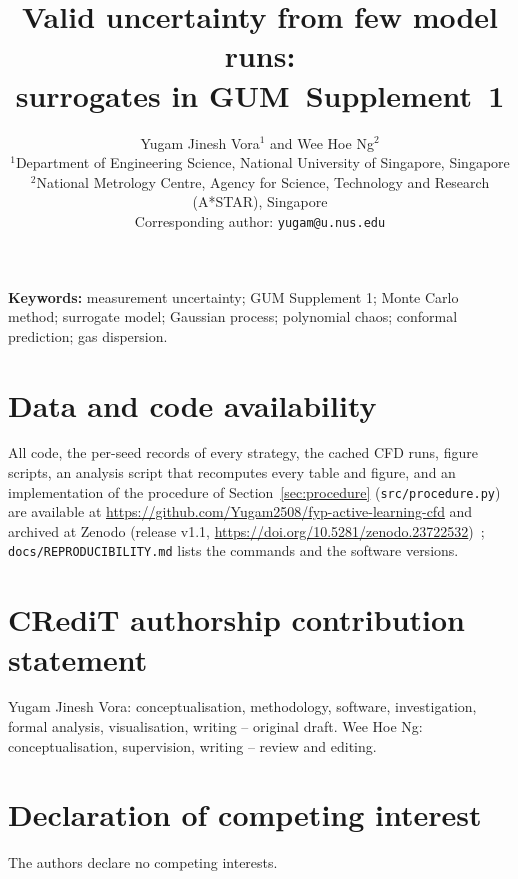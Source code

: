 \documentclass[11pt]{article}
\title{\bfseries Valid uncertainty from few model runs:\\ surrogates in GUM~Supplement~1}
\author{%
Yugam Jinesh Vora$^{1}$ and Wee Hoe Ng$^{2}$\\[4pt]
\small $^{1}$Department of Engineering Science, National University of
Singapore, Singapore\\
\small $^{2}$National Metrology Centre, Agency for Science, Technology and
Research (A*STAR), Singapore\\
\small Corresponding author: \texttt{yugam@u.nus.edu}}
\date{}
\begin{document}
\maketitle

\begin{abstract}
\noindent

\end{abstract}

\noindent\textbf{Keywords:} measurement uncertainty; GUM Supplement 1;
Monte Carlo method; surrogate model; Gaussian process; polynomial chaos;
conformal prediction; gas dispersion.



\section*{Data and code availability}
All code, the per-seed records of every strategy, the cached CFD runs,
figure scripts, an analysis script that recomputes every table and
figure, and an implementation of the procedure of
Section~\ref{sec:procedure} (\texttt{src/procedure.py}) are available at
\url{https://github.com/Yugam2508/fyp-active-learning-cfd} and archived
at Zenodo (release v1.1, \url{https://doi.org/10.5281/zenodo.23722532})~\cite{repo};
\texttt{docs/REPRODUCIBILITY.md} lists the commands and the software
versions.

\section*{CRediT authorship contribution statement}
Yugam Jinesh Vora: conceptualisation, methodology, software, investigation,
formal analysis, visualisation, writing -- original draft. Wee Hoe Ng:
conceptualisation, supervision, writing -- review and editing.

\section*{Declaration of competing interest}
The authors declare no competing interests.

\small


\end{document}
